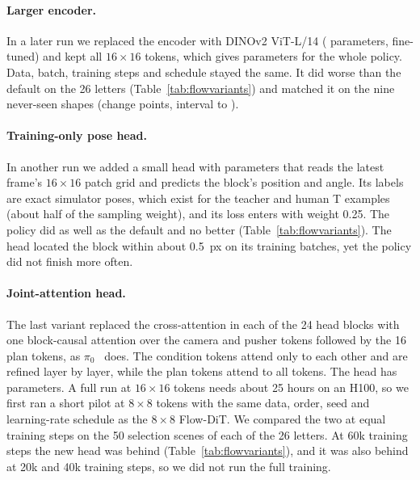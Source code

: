 \documentclass[10pt,twocolumn,letterpaper]{article}
\begin{document}
\paragraph{Larger encoder.}
In a later run we replaced the encoder with DINOv2 ViT-L/14 (\numFlowLargeEncoder{} parameters, fine-tuned) and
kept all $16\times16$ tokens, which gives \numFlowLargeParams{} parameters for the whole policy. Data, batch, training steps and
schedule stayed the same. It did worse than the default on the 26 letters (Table~\ref{tab:flowvariants}) and matched it
on the nine never-seen shapes (change \numFlowLargeUnseenVsFlow{} points, interval \numFlowLargeUnseenVsFlowLo{} to
\numFlowLargeUnseenVsFlowHi).

\paragraph{Training-only pose head.}
In another run we added a small head with \numFlowPoseHeadParams{} parameters that reads the latest frame's
$16\times16$ patch grid and predicts the block's position and angle. Its labels are exact simulator poses, which exist
for the teacher and human T examples (about half of the sampling weight), and its loss enters with weight 0.25. The
policy did as well as the default and no better (Table~\ref{tab:flowvariants}). The head located the block within about
0.5~px on its training batches, yet the policy did not finish more often. %

\paragraph{Joint-attention head.}
The last variant replaced the cross-attention in each of the 24 head blocks with one block-causal attention over
the camera and pusher tokens followed by the 16 plan tokens, as $\pi_0$~\citep{black2025pi0} does. The condition
tokens attend only to each other and are refined layer by layer, while the plan tokens attend to all tokens. The head
has \numPrefixHeadParams{} parameters. A full run at $16\times16$ tokens needs about 25 hours on an H100, so we first ran
a short pilot at $8\times8$ tokens with the same data, order, seed and learning-rate schedule as the $8\times8$
Flow-DiT. We compared the two at equal training steps on the 50 selection scenes of each of the 26 letters. At 60k
training steps the new head was behind (Table~\ref{tab:flowvariants}), and it was also behind at 20k and 40k training
steps, so we did not run the full training.
\end{document}
